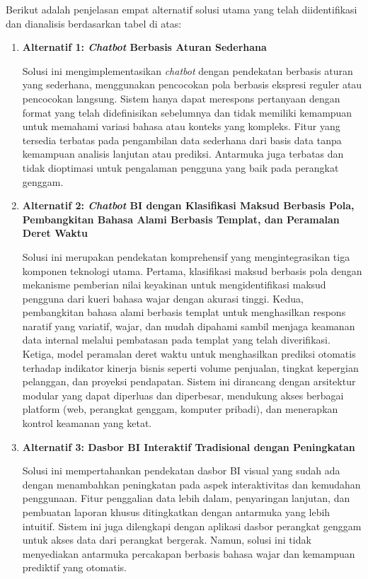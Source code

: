 Berikut adalah penjelasan empat alternatif solusi utama yang telah diidentifikasi dan dianalisis berdasarkan tabel di atas:
\begin{enumerate}
    \item\textbf{Alternatif 1: \textit{Chatbot} Berbasis Aturan Sederhana}
    
    Solusi ini mengimplementasikan \textit{chatbot} dengan pendekatan berbasis aturan yang sederhana, menggunakan pencocokan pola berbasis ekspresi reguler atau pencocokan langsung. Sistem hanya dapat merespons pertanyaan dengan format yang telah didefinisikan sebelumnya dan tidak memiliki kemampuan untuk memahami variasi bahasa atau konteks yang kompleks. Fitur yang tersedia terbatas pada pengambilan data sederhana dari basis data tanpa kemampuan analisis lanjutan atau prediksi. Antarmuka juga terbatas dan tidak dioptimasi untuk pengalaman pengguna yang baik pada perangkat genggam.

    \item\textbf{Alternatif 2: \textit{Chatbot} BI dengan Klasifikasi Maksud Berbasis Pola, Pembangkitan Bahasa Alami Berbasis Templat, dan Peramalan Deret Waktu}

    Solusi ini merupakan pendekatan komprehensif yang mengintegrasikan tiga komponen teknologi utama. Pertama, klasifikasi maksud berbasis pola dengan mekanisme pemberian nilai keyakinan untuk mengidentifikasi maksud pengguna dari kueri bahasa wajar dengan akurasi tinggi. Kedua, pembangkitan bahasa alami berbasis templat untuk menghasilkan respons naratif yang variatif, wajar, dan mudah dipahami sambil menjaga keamanan data internal melalui pembatasan pada templat yang telah diverifikasi. Ketiga, model peramalan deret waktu untuk menghasilkan prediksi otomatis terhadap indikator kinerja bisnis seperti volume penjualan, tingkat kepergian pelanggan, dan proyeksi pendapatan. Sistem ini dirancang dengan arsitektur modular yang dapat diperluas dan diperbesar, mendukung akses berbagai platform (web, perangkat genggam, komputer pribadi), dan menerapkan kontrol keamanan yang ketat.

    \item\textbf{Alternatif 3: Dasbor BI Interaktif Tradisional dengan Peningkatan}

    Solusi ini mempertahankan pendekatan dasbor BI visual yang sudah ada dengan menambahkan peningkatan pada aspek interaktivitas dan kemudahan penggunaan. Fitur penggalian data lebih dalam, penyaringan lanjutan, dan pembuatan laporan khusus ditingkatkan dengan antarmuka yang lebih intuitif. Sistem ini juga dilengkapi dengan aplikasi dasbor perangkat genggam untuk akses data dari perangkat bergerak. Namun, solusi ini tidak menyediakan antarmuka percakapan berbasis bahasa wajar dan kemampuan prediktif yang otomatis.


\end{enumerate}

